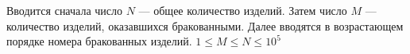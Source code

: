 Вводится сначала число $N$ --- общее количество изделий. Затем число $M$ --- количество изделий, оказавшихся бракованными. Далее вводятся в возрастающем порядке номера бракованных изделий. $1 \le M \le N \le 10^5$
